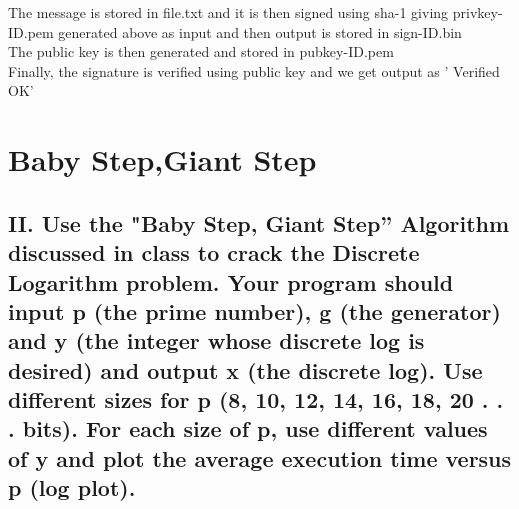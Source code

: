 \documentclass{article}
\begin{document}
\noindent The message is stored in file.txt and it is then signed using sha-1 giving privkey-ID.pem generated above as input and then output is stored in sign-ID.bin\\

\noindent The public key is then generated and stored in pubkey-ID.pem \\

\noindent Finally, the signature is verified using public key and we get output as ' Verified OK'







\section*{Baby Step,Giant Step}
\subsection*{II. Use the "Baby Step, Giant Step” Algorithm discussed in class to crack the
Discrete Logarithm problem. Your program should input p (the prime number), g
(the generator) and y (the integer whose discrete log is desired) and output x
(the discrete log). Use different sizes for p (8, 10, 12, 14, 16, 18, 20 . . . bits).
For each size of p, use different values of y and plot the average execution time
versus p (log plot).}
\end{document}

